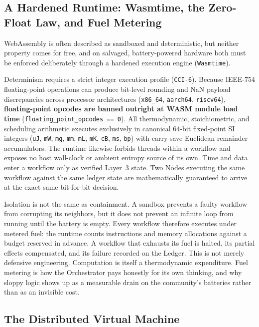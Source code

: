 \subsection{A Hardened Runtime: Wasmtime, the Zero-Float Law, and Fuel Metering}

WebAssembly is often described as sandboxed and deterministic, but neither property comes for free, and on salvaged, battery-powered hardware both must be enforced deliberately through a hardened execution engine (\texttt{Wasmtime}).

Determinism requires a strict integer execution profile (\texttt{CCI-6}). Because IEEE-754 floating-point operations can produce bit-level rounding and NaN payload discrepancies across processor architectures (\texttt{x86\_64}, \texttt{aarch64}, \texttt{riscv64}), \textbf{floating-point opcodes are banned outright at WASM module load time} (\texttt{floating\_point\_opcodes == 0}). All thermodynamic, stoichiometric, and scheduling arithmetic executes exclusively in canonical 64-bit fixed-point SI integers (\texttt{uJ}, \texttt{mW}, \texttt{mg}, \texttt{mm}, \texttt{mL}, \texttt{mK}, \texttt{cB}, \texttt{ms}, \texttt{bp}) with carry-save Euclidean remainder accumulators. The runtime likewise forbids threads within a workflow and exposes no host wall-clock or ambient entropy source of its own. Time and data enter a workflow only as verified Layer~3 state. Two Nodes executing the same workflow against the same ledger state are mathematically guaranteed to arrive at the exact same bit-for-bit decision.

Isolation is not the same as containment. A sandbox prevents a faulty workflow from corrupting its neighbors, but it does not prevent an infinite loop from running until the battery is empty. Every workflow therefore executes under metered fuel: the runtime counts instructions and memory allocations against a budget reserved in advance. A workflow that exhausts its fuel is halted, its partial effects compensated, and its failure recorded on the Ledger. This is not merely defensive engineering. Computation is itself a thermodynamic expenditure. Fuel metering is how the Orchestrator pays honestly for its own thinking, and why sloppy logic shows up as a measurable drain on the community's batteries rather than as an invisible cost.

\subsection{The Distributed Virtual Machine}

